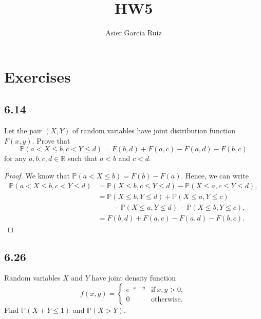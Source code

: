 \documentclass{article}
\title{HW5}
\author{Asier Garcia Ruiz }
\newcommand{\R}{\mathbb{R}}
\renewcommand{\P}[1]{\mathbb{P}(#1)}
\begin{document}
\maketitle

\section*{Exercises}
\subsection*{6.14}
Let the pair $(X,Y)$ of random variables have joint distribution function
$F(x,y)$. Prove that
\[\P{a<X \leq b, c<Y\leq d} = F(b,d) + F(a,c) - F(a,d) - F(b,c)\]
for any $a,b,c,d \in \R$ such that $a < b$ and $c < d$.

\begin{proof}
    We know that $\P{a < X \leq b} = F(b) - F(a)$. Hence, we can write
    \begin{align*}
        \P{a<X \leq b, c<Y\leq d} & = \P{X \leq b, c \leq Y \leq d} - \P{X \leq a, c \leq Y \leq d}, \\
                                  & = \P{X \leq b, Y \leq d} + \P{X \leq a, Y \leq c}                \\
                                  & \qquad - \P{X \leq a, Y \leq d} - \P{X \leq b, Y \leq c},        \\
                                  & = F(b,d) + F(a,c) - F(a,d) - F(b,c).
    \end{align*}
\end{proof}

\subsection*{6.26}
Random variables $X$ and $Y$ have joint density function
\begin{equation*}
    f(x,y) = \begin{cases}
        e^{-x-y} & \text{if} \ x,y > 0, \\
        0        & \text{otherwise}.
    \end{cases}
\end{equation*}
Find $\P{X+Y \leq 1}$ and $\P{X>Y}$.
\end{document}
